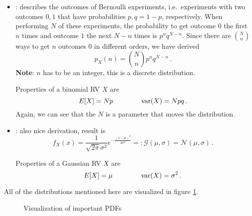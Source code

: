 \begin{ex}
\begin{itemize}
\item {}: describes the outcomes of Bernoulli experiments, i.e.~experiments with two outcomes $0, 1$ that have probabilities $p, q = 1 - p$, respectively. When performing $N$ of these experiments, the probability to get outcome $0$ the first $n$ times and outcome $1$ the next $N - n$ times is $p^n q^{N - n}$. Since there are $\binom{N}{n}$ ways to get $n$ outcomes $0$ in different orders, we have derived
\begin{equation}
p_X(n) = \binom{N}{n} p^n q^{N - n} \, .
\end{equation}
\textbf{Note}: $n$ has to be an integer, this is a discrete distribution.

Properties of a binomial RV $X$ are
\begin{equation}
E[X] = N p \qquad \qquad \operatorname{var}(X) = N p q \, .
\end{equation}
Again, we can see that the $N$ is a parameter that moves the distribution.


\item {}: also nice derivation, result is
\begin{equation}
f_X(x) = \frac{1}{\sqrt{2 \pi} \sigma^2} e^{- \frac{(x - \mu)^2}{2 \sigma^2}} =: \mathcal{G}(\mu, \sigma) = \mathcal{N}(\mu, \sigma) \, .
\end{equation}

Properties of a Gaussian RV $X$ are
\begin{equation}
E[X] = \mu \qquad \qquad \operatorname{var}(X) = \sigma^2 \, .
\end{equation}
\end{itemize}

All of the distributions mentioned here are visualized in figure \ref{fig:pdf_plots}.
\end{ex}



\begin{figure}
\centering

%
\hspace{0.04\textwidth}%
%


%
\hspace{0.04\textwidth}%
%




\caption{Visualization of important PDFs}
\label{fig:pdf_plots}
\end{figure}



